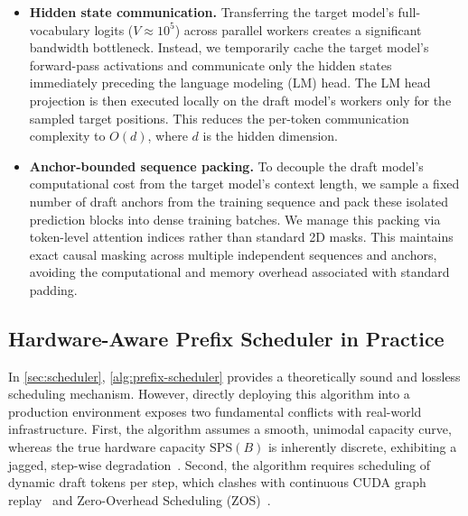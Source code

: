 \begin{itemize}[leftmargin=*,itemsep=4pt,topsep=4pt]   
    \item \textbf{Hidden state communication.} Transferring the target model's full-vocabulary logits ($V \approx 10^5$) across parallel workers creates a significant bandwidth bottleneck. Instead, we temporarily cache the target model's forward-pass activations and communicate only the hidden states immediately preceding the language modeling (LM) head. The LM head projection is then executed locally on the draft model's workers only for the sampled target positions. This reduces the per-token communication complexity to $O(d)$, where $d$ is the hidden dimension.
      
    \item \textbf{Anchor-bounded sequence packing.} To decouple the draft model's computational cost from the target model's context length, we sample a fixed number of draft anchors from the training sequence and pack these isolated prediction blocks into dense training batches. We manage this packing via token-level attention indices rather than standard 2D masks. This maintains exact causal masking across multiple independent sequences and anchors, avoiding the computational and memory overhead associated with standard padding.  
\end{itemize}


\subsection{Hardware-Aware Prefix Scheduler in Practice}
\label{sec:scheduler_in_practice}

In \autoref{sec:scheduler}, \autoref{alg:prefix-scheduler} provides a theoretically sound and lossless scheduling mechanism. However, directly deploying this algorithm into a production environment exposes two fundamental conflicts with real-world infrastructure. 
First, the algorithm assumes a smooth, unimodal capacity curve, whereas the true hardware capacity $\text{SPS}(B)$ is inherently discrete, exhibiting a jagged, step-wise degradation~\citep{Yan2020DemystifyingTC}. 
Second, the algorithm requires scheduling of dynamic draft tokens per step, which clashes with continuous CUDA graph replay~\citep{fireworks2023cudagraphs} and Zero-Overhead Scheduling (ZOS)~\citep{zhu2025nanoflowoptimallargelanguage,zheng2024sglangefficientexecutionstructured}. 

